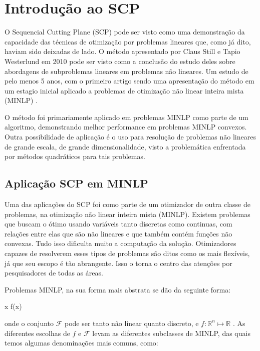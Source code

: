 \section{Introdução ao SCP}
O Sequencial Cutting Plane (SCP) \cite{Still2010} pode ser visto como uma demonstração da
capacidade das técnicas de otimização por problemas lineares que, como já dito, haviam
sido deixadas de lado. O método apresentado por Claus Still e Tapio Westerlund em 2010
pode ser visto como a conclusão do estudo deles sobre abordagens de subproblemas lineares
em problemas não lineares. Um estudo de pelo menos 5 anos, com o primeiro artigo sendo
uma apresentação do método em um estagio inicial aplicado a problemas de otimização
não linear inteira mista (MINLP) \cite{Still_2005}.

O método foi primariamente aplicado em problemas MINLP como parte de um algoritmo,
demonstrando melhor performance em problemas MINLP convexos. Outra possibilidade de
aplicação é o uso para resolução de problemas não lineares de grande escala, de grande
dimensionalidade, visto a problemática enfrentada por métodos quadráticos para tais
problemas.

\subsection{Aplicação SCP em MINLP}
Uma das aplicações do SCP foi como parte de um otimizador de outra classe de problemas, na
otimização não linear inteira mista (MINLP). Existem problemas que buscam o ótimo usando
variáveis tanto discretas como continuas, com relações entre elas que são não lineares e
que também contém funções não convexas. Tudo isso dificulta muito a computação da solução.
Otimizadores capazes de resolverem esses tipos de problemas são ditos como os mais flexíveis,
já que seu escopo é tão abrangente. Isso o torna o centro das atenções por pesquisadores de
todas as áreas.

Problemas MINLP, na sua forma mais abstrata se dão da seguinte forma:

\vspace{-15pt}
\begin{mini!}
{x}{ f(x) \label{minlp_obj}}{\label{prob_minlp}}{}
\end{mini!}
onde o conjunto \( \mathcal{F} \) pode ser tanto não linear quanto discreto, e \( f: \mathbb{R}^n \mapsto \mathbb{R}\) .
As diferentes escolhas
de \(f\) e \(\mathcal{F}\) levam as diferentes subclasses de MINLP, das quais temos algumas
denominações mais comuns, como:

